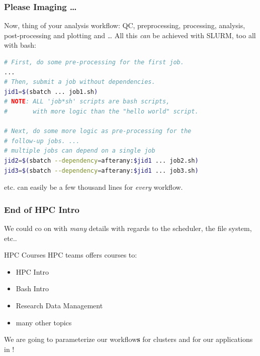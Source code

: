 

\begin{frame}[fragile]%
	\frametitle{Please Imaging \ldots}
	Now, thing of your analysis workflow: QC, preprocessing, processing, analysis, post-processing and plotting and \ldots \newline
	\pause
	All this \emph{can} be achieved with SLURM, too all with bash:
	\begin{lstlisting}[language=Bash, style=Shell]
# First, do some pre-processing for the first job.
...
# Then, submit a job without dependencies.
jid1=$(sbatch ... job1.sh)
# NOTE: ALL 'job*sh' scripts are bash scripts,
#       with more logic than the "hello world" script.		

# Next, do some more logic as pre-processing for the 
# follow-up jobs. ...
# multiple jobs can depend on a single job
jid2=$(sbatch --dependency=afterany:$jid1 ... job2.sh)
jid3=$(sbatch --dependency=afterany:$jid1 ... job3.sh)
	\end{lstlisting}
    etc. can easily be a few thousand lines for \emph{every} workflow.
	\vfill
\end{frame}


\begin{frame}
  \frametitle{End of HPC Intro}
  We could co on with \emph{many} details with regards to the scheduler, the file system, etc..
  \begin{block}{HPC Courses}
   HPC teams offers courses to:
   \begin{itemize}
    \item HPC Intro
    \item Bash Intro
    \item Research Data Management
    \item many other topics
   \end{itemize}
  \end{block}
  \pause
  \begin{hint}
      We are going to parameterize our workflow\textbf{s} for clusters and for our applications in \Snakemake!
  \end{hint}
\end{frame}





